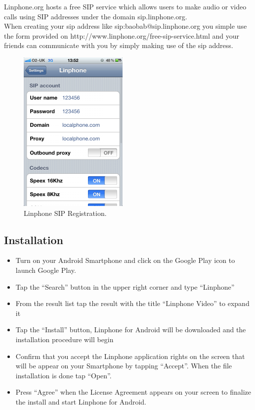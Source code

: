 \documentclass[a4paper]{article}
\begin{document}
Linphone.org hosts a free SIP service which allows users to make audio or video calls using SIP addresses under the domain sip.linphone.org. \\
When creating your sip address like sip:baobab@sip.linphone.org you simple use the form provided on http://www.linphone.org/free-sip-service.html and your friends can communicate with you by simply making use of the sip address.


\newpage
\begin{center}
\begin{figure}[h]
\centering
\includegraphics[width=0.4\linewidth]{./pictures/LinphoneSip.jpg}
\caption{\label{fig:Agile}Linphone SIP Registration.}
\end{figure}
\end{center}


\subsection{Installation}
\begin{itemize}
\item Turn on your Android Smartphone and click on the Google Play icon to launch Google Play.
\item Tap the “Search” button in the upper right corner and type “Linphone”
\item From the result list tap the result with the title “Linphone Video” to expand it
\item Tap the “Install” button, Linphone for Android will be downloaded and the installation procedure will begin
\item Confirm that you accept the Linphone application rights on the screen that will be appear on your Smartphone by tapping “Accept”. When the file installation is done tap “Open”.
\item Press “Agree” when the License Agreement appears on your screen to finalize the install and start Linphone for Android.
\end{itemize}
\end{document}

